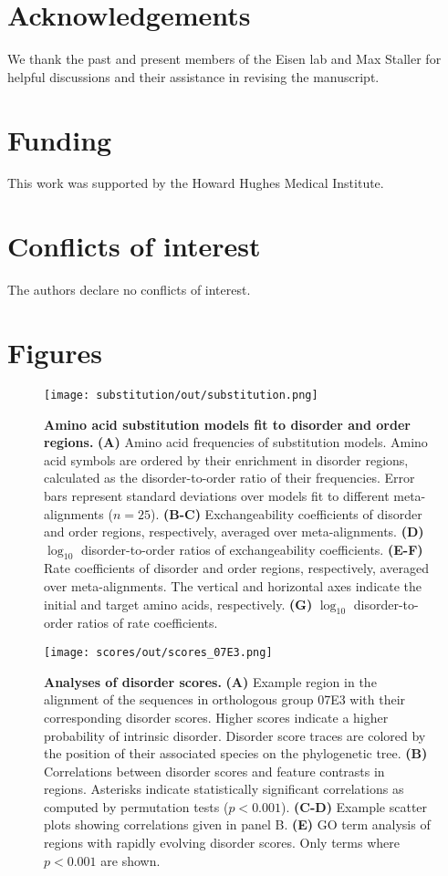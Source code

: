 \section{Acknowledgements}
We thank the past and present members of the Eisen lab and Max Staller for helpful discussions and their assistance in revising the manuscript.

\section{Funding}
This work was supported by the Howard Hughes Medical Institute.

\section{Conflicts of interest}
The authors declare no conflicts of interest.

\clearpage
\printbibliography

\clearpage
\section*{Figures}

\begin{figure}[h!]
\texttt{[image: substitution/out/substitution.png]}
\centering
\caption{\textbf{Amino acid substitution models fit to disorder and order regions.}
\textbf{(A)} Amino acid frequencies of substitution models. Amino acid symbols are ordered by their enrichment in disorder regions, calculated as the disorder-to-order ratio of their frequencies. Error bars represent standard deviations over models fit to different meta-alignments ($n = 25$).
\textbf{(B-C)} Exchangeability coefficients of disorder and order regions, respectively, averaged over meta-alignments. \textbf{(D)} $\log_{10}$ disorder-to-order ratios of exchangeability coefficients.
\textbf{(E-F)} Rate coefficients of disorder and order regions, respectively, averaged over meta-alignments. The vertical and horizontal axes indicate the initial and target amino acids, respectively.
\textbf{(G)} $\log_{10}$ disorder-to-order ratios of rate coefficients.}
\label{fig:substitution}
\end{figure}

\begin{figure}[h!]
\texttt{[image: scores/out/scores\_07E3.png]}
\centering
\caption{\textbf{Analyses of disorder scores.}
\textbf{(A)} Example region in the alignment of the sequences in orthologous group 07E3 with their corresponding disorder scores. Higher scores indicate a higher probability of intrinsic disorder. Disorder score traces are colored by the position of their associated species on the phylogenetic tree.
\textbf{(B)} Correlations between disorder scores and feature contrasts in regions. Asterisks indicate statistically significant correlations as computed by permutation tests ($p < 0.001$).
\textbf{(C-D)} Example scatter plots showing correlations given in panel B.
\textbf{(E)} GO term analysis of regions with rapidly evolving disorder scores. Only terms where $p < 0.001$ are shown.}
\label{fig:scores}
\end{figure}


